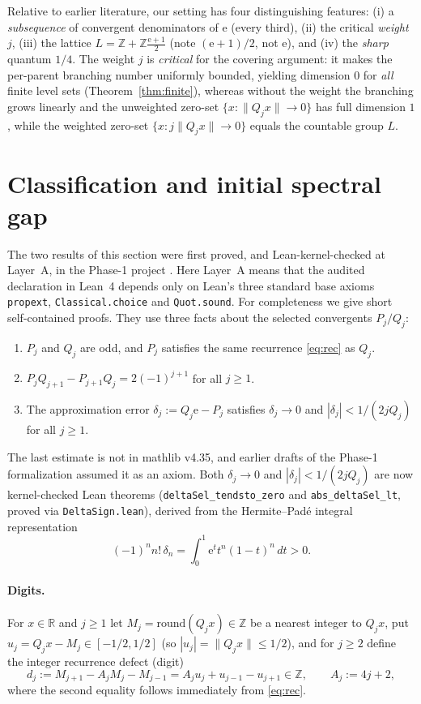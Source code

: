 \documentclass[11pt]{article}
\theoremstyle{definition}
\theoremstyle{remark}
\newcommand{\R}{\mathbb{R}}
\newcommand{\Z}{\mathbb{Z}}
\newcommand{\ee}{\mathrm{e}}
\begin{document}
Relative to earlier literature, our setting has four distinguishing features:
(i) a \emph{subsequence} of convergent denominators of $\ee$ (every third),
(ii) the critical \emph{weight} $j$, (iii) the lattice
$L=\Z+\Z\frac{\ee+1}{2}$ (note $(\ee+1)/2$, not $\ee$), and (iv) the
\emph{sharp} quantum $1/4$. The weight $j$ is \emph{critical} for the covering
argument: it makes the per-parent branching number uniformly bounded, yielding
dimension $0$ for \emph{all} finite level sets (Theorem~\ref{thm:finite}),
whereas without the weight the branching grows linearly and the unweighted
zero-set $\{x:\|Q_jx\|\to0\}$ has full dimension $1$, while the weighted
zero-set $\{x:j\|Q_jx\|\to0\}$ equals the countable group $L$.

\section{Classification and initial spectral gap}\label{sec:class}

The two results of this section were first proved, and Lean-kernel-checked at
Layer~A, in the Phase-1 project \cite{Phase1}. Here Layer~A means that the
audited declaration in Lean~4 depends only on Lean's three standard base axioms
\texttt{propext}, \texttt{Classical.choice} and \texttt{Quot.sound}. For
completeness we give short self-contained proofs. They use three facts about the
selected convergents $P_j/Q_j$:
\begin{enumerate}[label=(\arabic*),leftmargin=2em]
\item $P_j$ and $Q_j$ are odd, and $P_j$ satisfies the same recurrence
\eqref{eq:rec} as $Q_j$.
\item $P_jQ_{j+1}-P_{j+1}Q_j=2(-1)^{j+1}$ for all $j\ge1$.
\item The approximation error $\delta_j:=Q_j\ee-P_j$ satisfies $\delta_j\to0$
and $|\delta_j|<1/(2jQ_j)$ for all $j\ge1$.
\end{enumerate}
The last estimate is not in mathlib v4.35, and earlier drafts of the Phase-1
formalization assumed it as an axiom. Both $\delta_j\to0$ and
$|\delta_j|<1/(2jQ_j)$ are now kernel-checked Lean theorems
(\texttt{deltaSel\_tendsto\_zero} and \texttt{abs\_deltaSel\_lt}, proved via
\texttt{DeltaSign.lean}), derived from the Hermite--Pad\'e integral
representation
\[
(-1)^n n!\,\delta_n=\int_0^1 \ee^t t^n(1-t)^n\,dt>0.
\]

\paragraph{Digits.} For $x\in\R$ and $j\ge1$ let $M_j=\mathrm{round}(Q_jx)\in\Z$
be a nearest integer to $Q_jx$, put $u_j=Q_jx-M_j\in[-1/2,1/2]$ (so
$|u_j|=\|Q_jx\|\le1/2$), and for $j\ge2$ define the integer recurrence defect
(digit)
\begin{equation}\label{eq:defect-id}
 d_j:=M_{j+1}-A_jM_j-M_{j-1}=A_ju_j+u_{j-1}-u_{j+1}\in\Z,\qquad A_j:=4j+2,
\end{equation}
where the second equality follows immediately from \eqref{eq:rec}.
\end{document}
